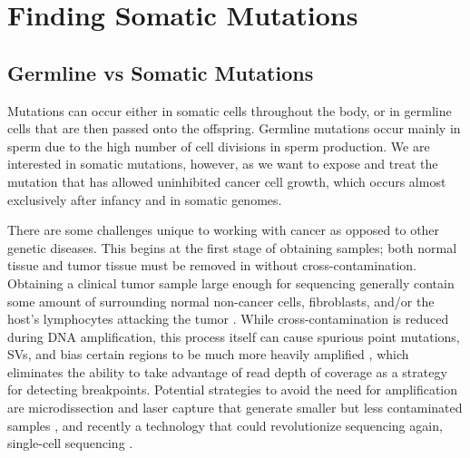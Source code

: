 \documentclass{easychithesis}
\begin{document}
\section{Finding Somatic Mutations}
\subsection{Germline vs Somatic Mutations}
Mutations can occur either in somatic cells throughout the body, or in germline cells that are then passed onto the offspring. Germline mutations occur mainly in sperm due to the high number of cell divisions in sperm production. We are interested in somatic mutations, however, as we want to expose and treat the mutation that has allowed uninhibited cancer cell growth, which occurs almost exclusively after infancy and in somatic genomes. 

There are some challenges unique to working with cancer as opposed to other genetic diseases. This begins at the first stage of obtaining samples; both normal tissue and tumor tissue must be removed in without cross-contamination. Obtaining a clinical tumor sample large enough for sequencing generally contain some amount of surrounding normal non-cancer cells, fibroblasts, and/or the host's lymphocytes attacking the tumor \cite{thomas2006sensitive, robison2010application}. While cross-contamination is reduced during DNA amplification, this process itself can cause spurious point mutations, SVs, and bias certain regions to be much more heavily amplified \cite{pinard2006assessment, rodrigue2009whole, robison2010application, rubin2009mutation}, which eliminates the ability to take advantage of read depth of coverage as a strategy for detecting breakpoints. Potential strategies to avoid the need for amplification are microdissection and laser capture that generate smaller but less contaminated samples \cite{application}, and recently a technology that could revolutionize sequencing again, single-cell sequencing \cite{navin2011tumour, shapiro2013single, nawy2014single}.
\end{document}

